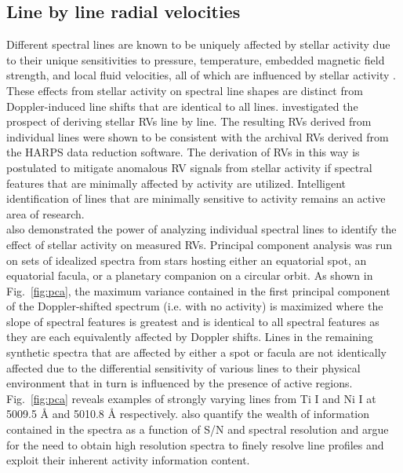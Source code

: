 \subsection{Line by line radial velocities}
Different spectral lines are known to be uniquely affected by stellar activity due to their
unique sensitivities to pressure, temperature, embedded magnetic field strength, and local fluid
velocities, all of which are influenced by stellar activity \citep{davis17,wise18}. These
effects from stellar activity on spectral line shapes are distinct from Doppler-induced
line shifts that are identical to all lines. \cite{dumusque18} investigated
the prospect of deriving stellar RVs line by line. The resulting RVs derived from
individual lines were shown to be
consistent with the archival RVs derived from the HARPS data reduction software.
The derivation of RVs in this way is postulated to mitigate anomalous RV signals
from stellar activity if spectral features that are minimally affected by activity
are utilized. Intelligent identification of lines that are minimally sensitive to
activity remains an active area of research. \\

\cite{davis17} also demonstrated the power of analyzing individual spectral lines
to identify the effect of stellar activity on measured RVs. Principal component analysis
was run on sets of idealized spectra from stars hosting either an equatorial spot,
an equatorial facula, or a planetary companion on a circular orbit. As shown in
Fig.~\ref{fig:pca}, the maximum variance contained in the first principal component
of the Doppler-shifted spectrum (i.e. with no activity) is maximized where the slope
of spectral features is greatest and is identical to all spectral features as they
are each equivalently affected by Doppler shifts. Lines in the remaining synthetic
spectra that are affected by either a spot or facula are not identically affected due
to the differential sensitivity of various lines to their physical environment
that in turn is influenced by the presence of active regions. Fig.~\ref{fig:pca}
reveals examples of strongly varying lines from Ti \footnotesize I \normalsize and Ni
\footnotesize I \normalsize at 5009.5 \AA{} and 5010.8 \AA{} respectively.
\cite{davis17} also quantify the wealth of information contained in the spectra
as a function of S/N and spectral resolution and argue for the need to obtain
high resolution spectra to finely resolve line profiles and exploit their inherent
activity information content.

